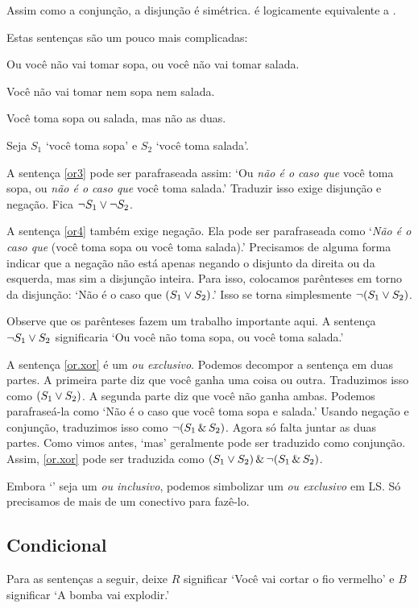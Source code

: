 Assim como a conjunção, a disjunção é simétrica. \eor{} é logicamente equivalente a \eor{}.

Estas sentenças são um pouco mais complicadas:

\begin{earg}
\item[\ex{or3}] Ou você não vai tomar sopa, ou você não vai tomar salada.
\item[\ex{or4}] Você não vai tomar nem sopa nem salada.
\item[\ex{or.xor}] Você toma sopa ou salada, mas não as duas.
\end{earg}

Seja $S_1$ `você toma sopa' e $S_2$ `você toma salada'.

A sentença \ref{or3} pode ser parafraseada assim: `Ou \emph{não é o caso que} você toma sopa, ou \emph{não é o caso que} você toma salada.' Traduzir isso exige disjunção e negação. Fica $\neg S_1 \vee \neg S_2$.

A sentença \ref{or4} também exige negação. Ela pode ser parafraseada como `\emph{Não é o caso que} (você toma sopa ou você toma salada).' Precisamos de alguma forma indicar que a negação não está apenas negando o disjunto da direita ou da esquerda, mas sim a disjunção inteira. Para isso, colocamos parênteses em torno da disjunção: `Não é o caso que $(S_1 \vee S_2)$.' Isso se torna simplesmente $\neg (S_1 \vee S_2)$.

Observe que os parênteses fazem um trabalho importante aqui. A sentença $\neg S_1 \vee S_2$ significaria `Ou você não toma sopa, ou você toma salada.'

A sentença \ref{or.xor} é um \emph{ou exclusivo}. Podemos decompor a sentença em duas partes. A primeira parte diz que você ganha uma coisa ou outra. Traduzimos isso como $(S_1 \vee S_2)$. A segunda parte diz que você não ganha ambas. Podemos parafraseá-la como `Não é o caso que você toma sopa e salada.' Usando negação e conjunção, traduzimos isso como $\neg(S_1 \,\&\, S_2)$. Agora só falta juntar as duas partes. Como vimos antes, `mas' geralmente pode ser traduzido como conjunção. Assim, \ref{or.xor} pode ser traduzida como $(S_1 \vee S_2) \,\&\, \neg(S_1 \,\&\, S_2)$.

Embora `\eor' seja um \emph{ou inclusivo}, podemos simbolizar um \emph{ou exclusivo} em {LS}. Só precisamos de mais de um conectivo para fazê-lo.


\subsection{Condicional}
Para as sentenças a seguir, deixe $R$ significar `Você vai cortar o fio vermelho' e $B$ significar `A bomba vai explodir.'

